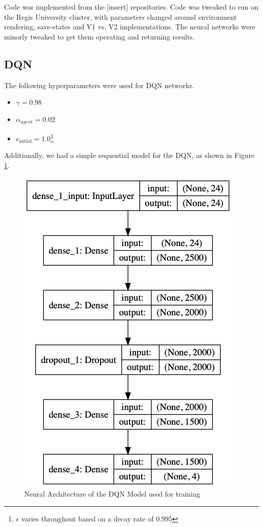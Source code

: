 \documentclass[doc, onecolumn, 12pt]{apa6}
\begin{document}
Code was implemented from the [insert] repositories. Code was tweaked to run on the Regis University cluster, with parameters changed around environment rendering, save-states and V1 vs. V2 implementations. The neural networks were minorly tweaked to get them operating and returning results. 

\subsection{DQN}
The following hyperparameters were used for DQN networks. \begin{itemize}
\item $\gamma = 0.98$
\item $\alpha_{agent} = 0.02$
\item $\epsilon_{\text{initial}} = 1.0$\footnote{$\epsilon$ varies throughout based on a decay rate of $0.995$} 
\end{itemize}

Additionally, we had a simple sequential model for the DQN, as shown in Figure \ref{DQN_Architecture}.

\begin{figure}
\label{DQN_Architecture}
\includegraphics[width=\textwidth]{results/dqn/DQN_Model.png}
\caption{Neural Architecture of the DQN Model used for training}
\end{figure}
\end{document}
